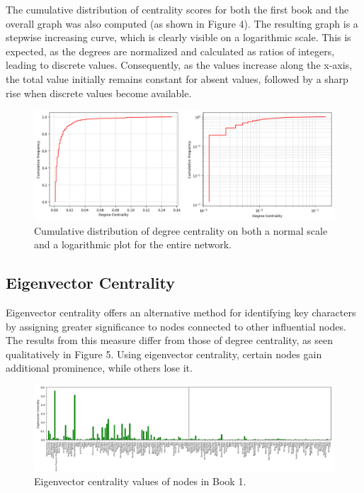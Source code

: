 \documentclass[12pt, a4paper]{article}
\begin{document}
The cumulative distribution of centrality scores for both the first book and the overall graph was also computed (as shown in Figure 4). The resulting graph is a stepwise increasing curve, which is clearly visible on a logarithmic scale. This is expected, as the degrees are normalized and calculated as ratios of integers, leading to discrete values. Consequently, as the values increase along the x-axis, the total value initially remains constant for absent values, followed by a sharp rise when discrete values become available.

\begin{figure}[H]
    \centering
    \includegraphics[width=1\linewidth]{Cumulative distribution of degree centrality.png}
    \caption{Cumulative distribution of degree centrality on both a normal scale and a logarithmic plot for the entire network.}
    \label{fig:enter-label}
\end{figure}

\subsection{Eigenvector Centrality}
\label{eigenvector centrality}
Eigenvector centrality offers an alternative method for identifying key characters by assigning greater significance to nodes connected to other influential nodes. The results from this measure differ from those of degree centrality, as seen qualitatively in Figure 5. Using eigenvector centrality, certain nodes gain additional prominence, while others lose it.

\begin{figure}[H]
    \centering
    \includegraphics[width=1\linewidth]{Eigenvector centrality values of nodes in Book 1.png}
    \caption{Eigenvector centrality values of nodes in Book 1.}
    \label{fig:enter-label}
\end{figure}
\end{document}
